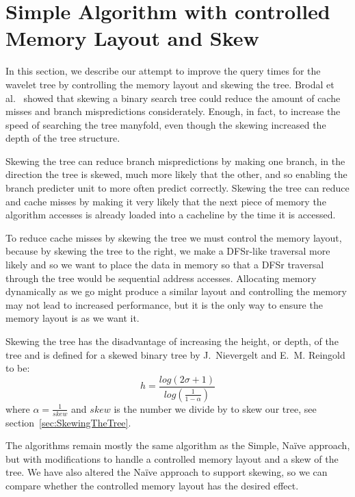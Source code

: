 \section{Simple Algorithm with controlled Memory Layout and Skew}
\label{sec:memorylayout}
In this section, we describe our attempt to improve the query times for the wavelet tree by controlling the memory layout and skewing the tree.
Brodal et al.~\cite{gerthSkewedBinarySearchTrees} showed that skewing a binary search tree could reduce the amount of cache misses and branch mispredictions considerately. Enough, in fact, to increase the speed of searching the tree manyfold, even though the skewing increased the depth of the tree structure.

Skewing the tree can reduce branch mispredictions by making one branch, in the direction the tree is skewed, much more likely that the other, and so enabling the branch predicter unit to more often predict correctly. 
Skewing the tree can reduce and cache misses by making it very likely that the next piece of memory the algorithm accesses is already loaded into a cacheline by the time it is accessed.

To reduce cache misses by skewing the tree we must control the memory layout, because by skewing the tree to the right, we make a DFSr-like traversal more likely and so we want to place the data in memory so that a DFSr traversal through the tree would be sequential address accesses.
Allocating memory dynamically as we go might produce a similar layout and controlling the memory may not lead to increased performance, but it is the only way to ensure the memory layout is as we want it.

Skewing the tree has the disadvantage of increasing the height, or depth, of the tree 
and is defined for a skewed binary tree by J.~Nievergelt and E.~M. Reingold~\cite{Nievergelt:1972:BST:800152.804906} to be:
\[ h = \frac{log(2\sigma+1)}{ log(\frac{1}{1-\alpha})}\]
where $\alpha = \frac{1}{skew}$ and $skew$ is the number we divide by to skew our tree, see section~\ref{sec:SkewingTheTree}.

The algorithms remain mostly the same algorithm as the Simple, Naïve approach, but with modifications to handle a controlled memory layout and a skew of the tree.
We have also altered the Naïve approach to support skewing, so we can compare whether the controlled memory layout has the desired effect.

